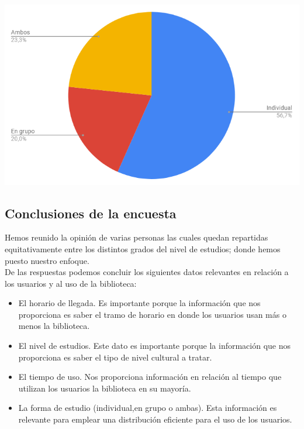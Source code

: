 \documentclass[12pt]{article}
\begin{document}
\begin{center}
\end{center}\begin{center}
	\centering
	\includegraphics[width=1\textwidth]{graficouso}
\end{center}

\subsection{Conclusiones de la encuesta}

	Hemos reunido la opinión de varias personas las cuales quedan repartidas equitativamente entre los distintos grados del nivel de estudios; donde hemos puesto nuestro enfoque.\\

	De las respuestas podemos concluir los siguientes datos relevantes en relación a los usuarios y al uso de la biblioteca:
\begin{itemize}

\item El horario de llegada. Es importante porque la información que nos proporciona es saber el tramo de horario en donde los usuarios usan más o menos la biblioteca.\\

\item El nivel de estudios. Este dato es importante porque la información que nos proporciona es saber el tipo de nivel cultural a tratar.\\

\item El tiempo de uso. Nos proporciona información en relación al tiempo que utilizan los usuarios la biblioteca en su mayoría.\\

\item La forma de estudio (individual,en grupo o ambas). Esta información es relevante para emplear una distribución eficiente para el uso de los usuarios.\\

\end{itemize}
\end{document}
